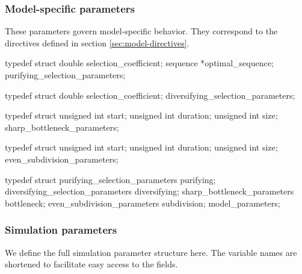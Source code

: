 \documentclass{article}
\begin{document}
      \subsubsection{Model-specific parameters}
	\label{sec:model-parameters}

	These parameters govern model-specific behavior. They correspond to the
	directives defined in section \ref{sec:model-directives}.

\begin{ccode}
typedef struct {
  double		selection_coefficient;
  sequence		*optimal_sequence;
} purifying_selection_parameters;

typedef struct {
  double		selection_coefficient;
} diversifying_selection_parameters;

typedef struct {
  unsigned int		start;
  unsigned int		duration;
  unsigned int		size;
} sharp_bottleneck_parameters;

typedef struct {
  unsigned int		start;
  unsigned int		duration;
  unsigned int		size;
} even_subdivision_parameters;

typedef struct {
  purifying_selection_parameters	purifying;
  diversifying_selection_parameters	diversifying;
  sharp_bottleneck_parameters		bottleneck;
  even_subdivision_parameters		subdivision;
} model_parameters;
\end{ccode}

      \subsubsection{Simulation parameters}
	\label{sec:simulation-parameter-complete}

	We define the full simulation parameter structure here. The variable
	names are shortened to facilitate easy access to the fields.
\end{document}
